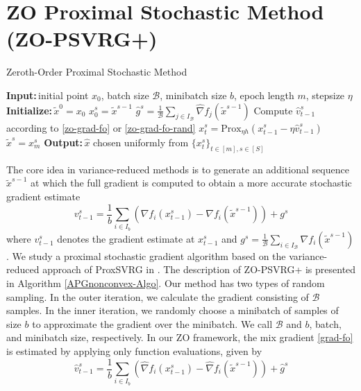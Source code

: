\documentclass[iicol,sn-basic]{sn-jnl}
\theoremstyle{thmstyleone}%
\theoremstyle{thmstyletwo}%
\theoremstyle{thmstylethree}%
\newcommand*{\Po}{\text{Prox}}
\newcommand{\Initialize}{\textbf{Initialize:}{\,}}
\newcommand{\Input}{\textbf{Input:}{\,}}
\newcommand{\Output}{\textbf{Output:}{\,}}
\begin{document}
\section{ZO Proximal Stochastic Method (ZO-PSVRG+)}
\begin{algorithm}
\caption{Zeroth-Order Proximal Stochastic Method}
\begin{algorithmic}[1]
\State\Input initial point $x_0$, batch size $\mathcal{B}$, minibatch size $b$, epoch length $m$, stepsize $\eta$
\State\Initialize $\tilde{x}^0 = x_0$
\State $x_0^s = \tilde{x}^{s-1}$
\State $\hat{g}^s = \frac{1}{\mathcal{B}} \sum_{j\in I_{\mathcal{B}}} \hat{\nabla} f_j (\tilde{x}^{s-1})$
\State Compute ${\hat{v}}_{t-1}^s$ according to \eqref{zo-grad-fo} or \eqref{zo-grad-fo-rand}
\State $x_{t}^s= \Po_{\eta h}(x_{t-1}^s - \eta \hat{v}_{t-1}^s)$
\EndFor
\State $\tilde{x}^{s} = x_m^s$
 \EndFor
 \State\Output $\hat{x}$ chosen uniformly from $\{x_{t}^s\}_{t\in [m], s\in [S]}$
\end{algorithmic}
\label{APGnonconvex-Algo}
\end{algorithm}
The core idea in variance-reduced methods is to generate an additional sequence $\tilde{x}^{s-1}$ at which the full gradient is computed to obtain a more accurate stochastic gradient estimate
\begin{equation}\label{grad-fo}
{{v}}_{t-1}^s = \frac{1}{b} \sum_{i\in I_b}\left({\nabla} f_{i}(x_{t-1}^s)-{\nabla} f_{i}(\tilde{x}^{s-1})\right)+{g}^s
\end{equation}
where ${{v}}_{t-1}^s$ denotes the gradient estimate at $x_{t-1}^s$ and  ${g}^s= \frac{1}{\mathcal{B}}\sum_{i\in I_{\mathcal{B}}}{\nabla} f_{i}(\tilde{x}^{s-1})$. We study a proximal stochastic gradient algorithm based on the variance-reduced approach of ProxSVRG in  \cite{xiao2014proximal,reddi2016proximal,li2018simple}.
The description of ZO-PSVRG+ is presented in Algorithm \ref{APGnonconvex-Algo}. Our method has two types of random sampling. In the outer iteration, we calculate the gradient consisting of $\mathcal{B}$ samples. In the inner iteration, we randomly  choose a minibatch of samples of size $b$ to approximate  the gradient over the minibatch. We call $\mathcal{B}$ and $b$, batch, and  minibatch size, respectively. 
In our ZO framework, the mix gradient \eqref{grad-fo} is estimated by applying only function evaluations, given by
\begin{equation}\label{zo-grad-fo}
{\hat{v}}_{t-1}^s = \frac{1}{b} \sum_{i\in I_b}\left(\hat{\nabla} f_{i}(x_{t-1}^s)-\hat{\nabla} f_{i}(\tilde{x}^{s-1})\right)+\hat{g}^s
\end{equation}
\end{document}
